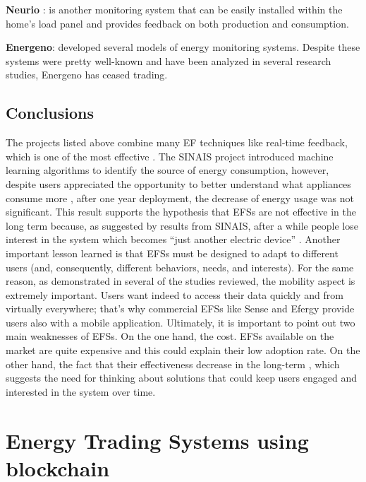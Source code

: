 \textbf{Neurio} \cite{neurio}: is another monitoring system that can be easily installed within the home’s load panel and provides feedback on both production and consumption.



\textbf{Energeno}: developed several models of energy monitoring systems. Despite these systems were pretty well-known and have been analyzed in several research studies, Energeno has ceased trading.


\subsection{Conclusions}

The projects listed above combine many \ac{EF} techniques like real-time feedback, which is one of the most effective \cite{Froehlich2010}. The \ac{SINAIS} project introduced machine learning algorithms to identify the source of energy consumption, however, despite users appreciated the opportunity to better understand what appliances consume more \cite{Pereira2013}, after one year deployment, the decrease of energy usage was not significant. This result supports the hypothesis that \acp{EFS} are not effective in the long term because, as suggested by results from \ac{SINAIS}, after a while people lose interest in the system which becomes “just another electric device” \cite{Pereira2013}. Another important lesson learned is that \acp{EFS} must be designed to adapt to different users (and, consequently, different behaviors, needs, and interests). For the same reason, as demonstrated in several of the studies reviewed, the mobility aspect is extremely important. Users want indeed to access their data quickly and from virtually everywhere; that’s why commercial \acp{EFS} like Sense and Efergy provide users also with a mobile application. Ultimately, it is important to point out two main weaknesses of \acp{EFS}. On the one hand, the cost. \acp{EFS} available on the market are quite expensive and this could explain their low adoption rate. On the other hand, the fact that their effectiveness decrease in the long-term \cite{Pereira2013}, which suggests the need for thinking about solutions that could keep users engaged and interested in the system over time. 



\section{Energy Trading Systems using blockchain} \label{sets}
